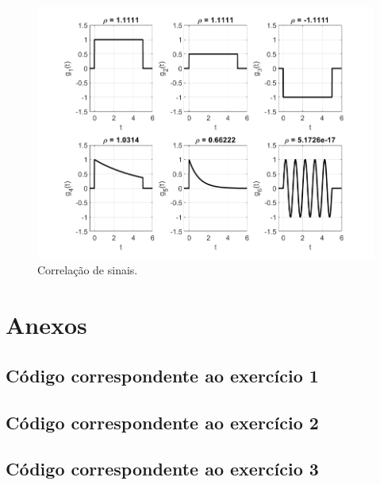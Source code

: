 \documentclass[a4paper,12pt,oneside,openany,table,xcdraw]{article}
\begin{document}
\vspace{0.4cm}
\begin{figure}[H]
\centering
\includegraphics[width=16cm]{ex4-corr}
\caption{Correlação de sinais.}
\label{ex3:sinal}
\end{figure}
 
\newpage
\section{Anexos}
\subsection{Código correspondente ao exercício 1} \label{anexo:ex1}

\vspace{0.3cm}


\vspace{0.3cm}


\vspace{0.3cm}



\vspace{0.3cm}
\subsection{Código correspondente ao exercício 2} \label{anexo:ex2}


\vspace{0.3cm}
\subsection{Código correspondente ao exercício 3} \label{anexo:ex3}

\vspace{0.3cm}
\end{document}
